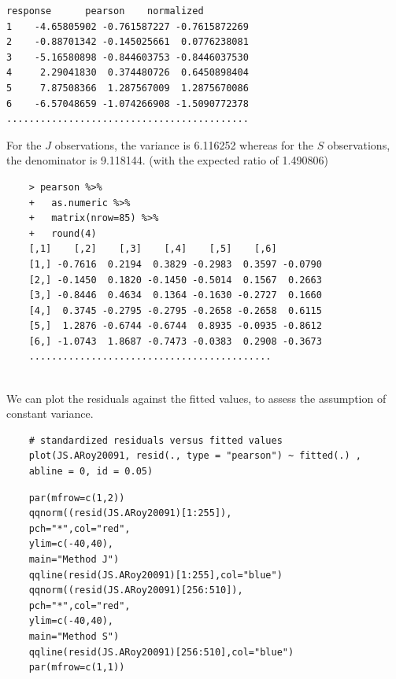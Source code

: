 \documentclass[Main.tex]{subfiles}
\begin{document}
\begin{verbatim}
response      pearson    normalized
1    -4.65805902 -0.761587227 -0.7615872269
2    -0.88701342 -0.145025661  0.0776238081
3    -5.16580898 -0.844603753 -0.8446037530
4     2.29041830  0.374480726  0.6450898404
5     7.87508366  1.287567009  1.2875670086
6    -6.57048659 -1.074266908 -1.5090772378
...........................................
\end{verbatim}
For the $J$ observations, the variance is 6.116252 whereas for the $S$ observations, the denominator is 9.118144. (with the expected ratio of  1.490806)


\begin{framed}
	\begin{verbatim}
	> pearson %>%
	+   as.numeric %>% 
	+   matrix(nrow=85) %>%
	+   round(4) 
	[,1]    [,2]    [,3]    [,4]    [,5]    [,6]
	[1,] -0.7616  0.2194  0.3829 -0.2983  0.3597 -0.0790
	[2,] -0.1450  0.1820 -0.1450 -0.5014  0.1567  0.2663
	[3,] -0.8446  0.4634  0.1364 -0.1630 -0.2727  0.1660
	[4,]  0.3745 -0.2795 -0.2795 -0.2658 -0.2658  0.6115
	[5,]  1.2876 -0.6744 -0.6744  0.8935 -0.0935 -0.8612
	[6,] -1.0743  1.8687 -0.7473 -0.0383  0.2908 -0.3673
	...........................................
	
	\end{verbatim}
\end{framed}

We can plot the residuals against the fitted values, to assess the assumption of constant variance. 
\begin{framed}
	\begin{verbatim}
	# standardized residuals versus fitted values 
	plot(JS.ARoy20091, resid(., type = "pearson") ~ fitted(.) , 
	abline = 0, id = 0.05)
	\end{verbatim}
\end{framed}


\begin{framed}
	\begin{verbatim}
	par(mfrow=c(1,2))
	qqnorm((resid(JS.ARoy20091)[1:255]),
	pch="*",col="red",
	ylim=c(-40,40),
	main="Method J")
	qqline(resid(JS.ARoy20091)[1:255],col="blue")
	qqnorm((resid(JS.ARoy20091)[256:510]),
	pch="*",col="red",
	ylim=c(-40,40),
	main="Method S")
	qqline(resid(JS.ARoy20091)[256:510],col="blue")
	par(mfrow=c(1,1))
	\end{verbatim}	
\end{framed}
\end{document}
